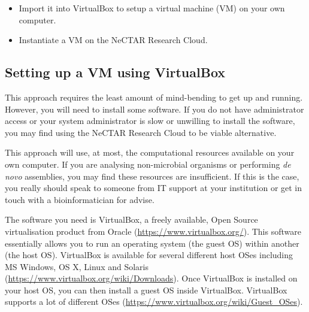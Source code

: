 \begin{itemize}
\item Import it into VirtualBox to setup a virtual machine (VM) on your own
computer.
\item Instantiate a VM on the NeCTAR Research Cloud.
\end{itemize}

\subsection{Setting up a VM using VirtualBox}
This approach requires the least amount of mind-bending to get up and running.
However, you will need to install some software. If you do not have
administrator access or your system administrator is slow or unwilling to
install the software, you may find using the NeCTAR Research Cloud to be viable
alternative.

This approach will use, at most, the computational resources available on
your own computer. If you are analysing non-microbial organisms or performing
\textit{de novo} assemblies, you may find these resources are insufficient. If this is the
case, you really should speak to someone from IT support at your institution or
get in touch with a bioinformatician for advise.

The software you need is VirtualBox, a freely available, Open Source
virtualisation product from Oracle (\url{https://www.virtualbox.org/}). This
software essentially allows you to run an operating system (the guest OS) within
another (the host OS). VirtualBox is available for several different host OSes
including MS Windows, OS X, Linux and Solaris
(\url{https://www.virtualbox.org/wiki/Downloads}). Once VirtualBox is installed
on your host OS, you can then install a guest OS inside VirtualBox. VirtualBox
supports a lot of different OSes
(\url{https://www.virtualbox.org/wiki/Guest_OSes}).

